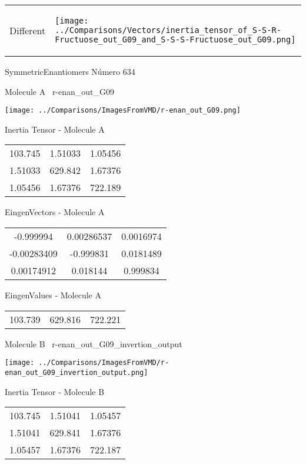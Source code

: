 \vtab[-5mm]
\begin{tabular}{*{2}{m{}}}
\begin{center}
\textcolor{NavyBlue}{\Large Different}
\end{center}
&
\begin{center}
\texttt{[image: ../Comparisons/Vectors/inertia\_tensor\_of\_S-S-R-Fructuose\_out\_G09\_and\_S-S-S-Fructuose\_out\_G09.png]}
\end{center}
\end{tabular}

 \newpage

\vtab[-3cm]
\begin{center}
{\large SymmetricEnantiomers \tab Número 634}
\end{center}
\begin{multicols}{2}
\begin{center}

Molecule A \
r-enan\_out\_G09

\texttt{[image: ../Comparisons/ImagesFromVMD/r-enan\_out\_G09.png]}

Inertia Tensor - Molecule A \\
\begin{tabular}{|c c c|}
103.745	 & 	1.51033	 & 	1.05456	 \\
1.51033	 & 	629.842	 & 	1.67376	 \\
1.05456	 & 	1.67376	 & 	722.189
\end{tabular}

\vtab
 EingenVectors - Molecule A     \\
\begin{tabular}{|c c c|}
-0.999994	 & 	0.00286537	 & 	0.0016974	 \\
-0.00283409	 & 	-0.999831	 & 	0.0181489	 \\
0.00174912	 & 	0.018144	 & 	0.999834
\end{tabular}

\vtab
 EingenValues - Molecule A     \\
\begin{tabular}{|c c c|}
103.739	 & 	629.816	 & 	722.221	 \\
\end{tabular}
\columnbreak

Molecule B \
r-enan\_out\_G09\_invertion\_output

\texttt{[image: ../Comparisons/ImagesFromVMD/r-enan\_out\_G09\_invertion\_output.png]}

Inertia Tensor - Molecule B \\
\begin{tabular}{|c c c|}
103.745	 & 	1.51041	 & 	1.05457	 \\
1.51041	 & 	629.841	 & 	1.67376	 \\
1.05457	 & 	1.67376	 & 	722.187
\end{tabular}


\end{center}
\end{multicols}
